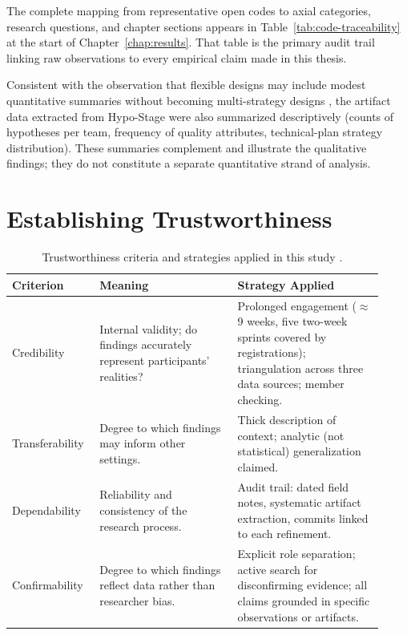 The complete mapping from representative open codes to axial categories,
research questions, and chapter sections appears in
Table~\ref{tab:code-traceability} at the start of
Chapter~\ref{chap:results}. That table is the primary audit trail linking
raw observations to every empirical claim made in this thesis.

Consistent with the observation that flexible designs may
include modest quantitative summaries without becoming multi-strategy
designs \citep{robson2016}, the artifact data extracted from Hypo-Stage were also summarized
descriptively (counts of hypotheses per team, frequency of quality
attributes, technical-plan strategy distribution). These summaries
complement and illustrate the qualitative findings; they do not constitute
a separate quantitative strand of analysis.

\section{Establishing Trustworthiness}
\label{sec:trustworthiness}

\begin{table}[htbp]
\centering
\caption{Trustworthiness criteria and strategies applied in this study \citep{robson2016}.}
\label{tab:trustworthiness}
\begin{tabular}{p{0.20\linewidth} p{0.35\linewidth} p{0.37\linewidth}}
\toprule
\textbf{Criterion} & \textbf{Meaning} & \textbf{Strategy Applied} \\
\midrule
Credibility & Internal validity; do findings accurately represent participants' realities? & Prolonged engagement ($\approx$9 weeks, five two-week sprints covered by registrations); triangulation across three data sources; member checking. \\
\midrule
Transferability & Degree to which findings may inform other settings. & Thick description of context; analytic (not statistical) generalization claimed. \\
\midrule
Dependability & Reliability and consistency of the research process. & Audit trail: dated field notes, systematic artifact extraction, commits linked to each refinement. \\
\midrule
Confirmability & Degree to which findings reflect data rather than researcher bias. & Explicit role separation; active search for disconfirming evidence; all claims grounded in specific observations or artifacts. \\
\bottomrule
\end{tabular}
\end{table}

